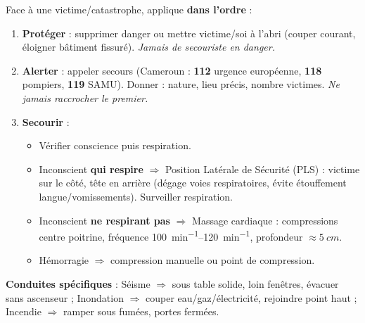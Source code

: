 \documentclass[11pt]{article}
\newcommand{\cle}[1]{{\popxbold\color{popdark}#1}}
\begin{document}
\begin{methode}
Face à une victime/catastrophe, applique \textbf{dans l'ordre} :
\begin{enumerate}
\item \textbf{Protéger} : supprimer danger ou mettre victime/soi à l'abri (couper courant, éloigner bâtiment fissuré). \emph{Jamais de secouriste en danger.}
\item \textbf{Alerter} : appeler secours (Cameroun : \textbf{112} urgence européenne, \textbf{118} pompiers, \textbf{119} SAMU). Donner : nature, lieu précis, nombre victimes. \emph{Ne jamais raccrocher le premier.}
\item \textbf{Secourir} :
      \begin{itemize}
      \item Vérifier conscience puis respiration.
      \item Inconscient \textbf{qui respire} $\Rightarrow$ \cle{Position Latérale de Sécurité (PLS)} : victime sur le côté, tête en arrière (dégage voies respiratoires, évite étouffement langue/vomissements). Surveiller respiration.
      \item Inconscient \textbf{ne respirant pas} $\Rightarrow$ \cle{Massage cardiaque} : compressions centre poitrine, fréquence \SIrange{100}{120}{min^{-1}}, profondeur $\approx \SI{5}{cm}$.
      \item Hémorragie $\Rightarrow$ compression manuelle ou point de compression.
      \end{itemize}
\end{enumerate}
\textbf{Conduites spécifiques} : Séisme $\Rightarrow$ sous table solide, loin fenêtres, évacuer sans ascenseur ; Inondation $\Rightarrow$ couper eau/gaz/électricité, rejoindre point haut ; Incendie $\Rightarrow$ ramper sous fumées, portes fermées.
\end{methode}
\end{document}
